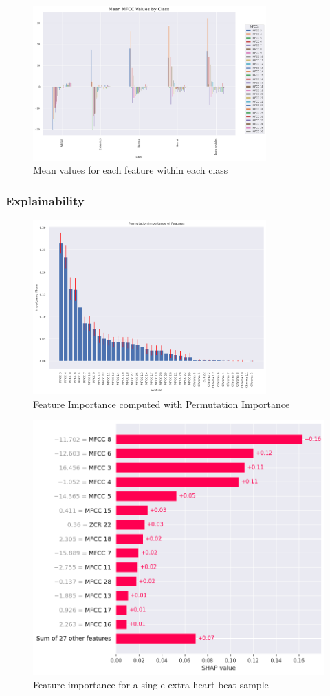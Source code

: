 \begin{figure}[htpb]
    \centering
    \includegraphics[width=0.8\textwidth]{../images/mean_val_for_features.png}
    \caption{Mean values for each feature within each class}
    \label{fig:mean_val_for_features}
\end{figure}

\subsubsection*{Explainability}

\begin{figure}[htpb]
    \centering
    \includegraphics[width=0.8\textwidth]{../images/permutation_feature_importance.png}
    \caption{Feature Importance computed with Permutation Importance}
    \label{fig:permutation_feature_importance}
\end{figure}


\begin{figure}[H]
    \centering
    \includegraphics[width=0.8\columnwidth]{../images/extrahls_feature_importance.png}
    \caption{Feature importance for a single extra heart beat sample}
    \label{fig:extrahls_feature_importance}
\end{figure}
